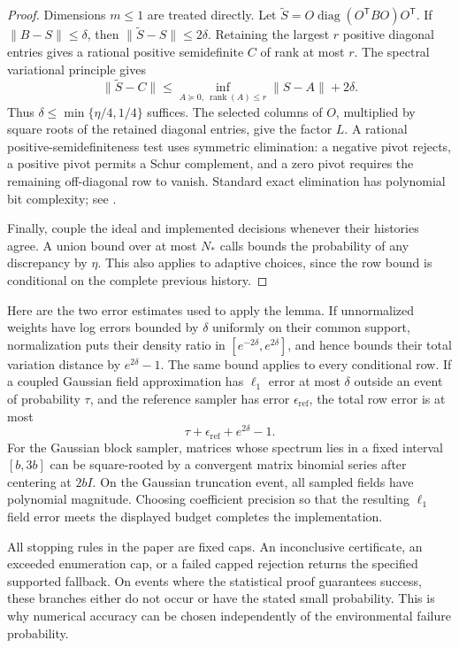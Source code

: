 \documentclass[11pt]{article}
\numberwithin{equation}{section}
\begin{document}
\begin{proof}
Dimensions $m\le1$ are treated directly. Let $\widetilde S=O\operatorname{diag}(O^{\mathsf T}BO)O^{\mathsf T}$. If $\|B-S\|\le\delta$, then $\|\widetilde S-S\|\le2\delta$. Retaining the largest $r$ positive diagonal entries gives a rational positive semidefinite $C$ of rank at most $r$. The spectral variational principle gives
\[
 \|\widetilde S-C\|
 \le\inf_{A\succeq0,\ \operatorname{rank}(A)\le r}\|S-A\|+2\delta.
\]
Thus $\delta\le\min\{\eta/4,1/4\}$ suffices. The selected columns of $O$, multiplied by square roots of the retained diagonal entries, give the factor $L$. A rational positive-semidefiniteness test uses symmetric elimination: a negative pivot rejects, a positive pivot permits a Schur complement, and a zero pivot requires the remaining off-diagonal row to vanish. Standard exact elimination has polynomial bit complexity; see \cite[Chapter~3]{Sch86}.

Finally, couple the ideal and implemented decisions whenever their histories agree. A union bound over at most $N_*$ calls bounds the probability of any discrepancy by $\eta$. This also applies to adaptive choices, since the row bound is conditional on the complete previous history.
\end{proof}

Here are the two error estimates used to apply the lemma. If unnormalized weights have log errors bounded by $\delta$ uniformly on their common support, normalization puts their density ratio in $[e^{-2\delta},e^{2\delta}]$, and hence bounds their total variation distance by $e^{2\delta}-1$. The same bound applies to every conditional row. If a coupled Gaussian field approximation has $\ell_1$ error at most $\delta$ outside an event of probability $\tau$, and the reference sampler has error $\epsilon_{\mathrm{ref}}$, the total row error is at most
\[
 \tau+\epsilon_{\mathrm{ref}}+e^{2\delta}-1.
\]
For the Gaussian block sampler, matrices whose spectrum lies in a fixed interval $[b,3b]$ can be square-rooted by a convergent matrix binomial series after centering at $2bI$. On the Gaussian truncation event, all sampled fields have polynomial magnitude. Choosing coefficient precision so that the resulting $\ell_1$ field error meets the displayed budget completes the implementation.

All stopping rules in the paper are fixed caps. An inconclusive certificate, an exceeded enumeration cap, or a failed capped rejection returns the specified supported fallback. On events where the statistical proof guarantees success, these branches either do not occur or have the stated small probability. This is why numerical accuracy can be chosen independently of the environmental failure probability.






\end{document}
